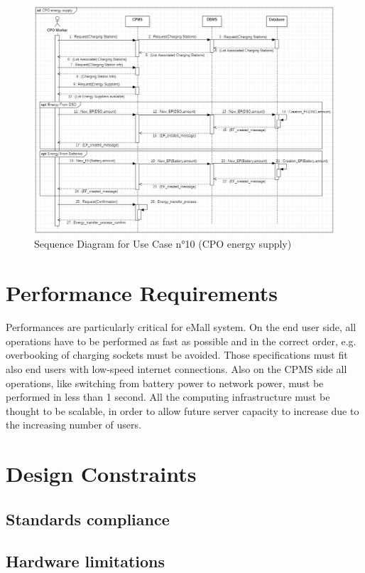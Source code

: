 \documentclass[a4paper]{report}
\begin{document}
\begin{figure}[p]
\includegraphics[width=\textwidth]{RASD/img/SD_EnergySupply_v2.png}
\caption{Sequence Diagram for Use Case n°10 (CPO energy supply)}
\label{fig:class-diagramRASD}
\end{figure}
\restoregeometry

\section{Performance Requirements}
Performances are particularly critical for eMall system. On the end user side, all operations have to be performed as fast as possible and in the correct order, e.g. overbooking of charging sockets must be avoided. Those specifications must fit also end users with low-speed internet connections. Also on the CPMS side all operations, like switching from battery power to network power, must be performed in less than 1 second. All the computing infrastructure must be thought to be scalable, in order to allow future server capacity to increase due to the increasing number of users.

\section{Design Constraints}
\subsection{Standards compliance}
\subsection{Hardware limitations}
\end{document}
